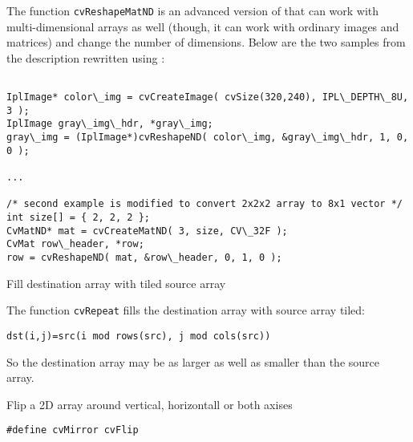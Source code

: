 The function \texttt{cvReshapeMatND} is an advanced version of  that can work with multi-dimensional arrays as well (though, it can work with ordinary images and matrices) and change the number of dimensions. Below are the two samples from the  description rewritten using :

\begin{lstlisting}

IplImage* color\_img = cvCreateImage( cvSize(320,240), IPL\_DEPTH\_8U, 3 );
IplImage gray\_img\_hdr, *gray\_img;
gray\_img = (IplImage*)cvReshapeND( color\_img, &gray\_img\_hdr, 1, 0, 0 );

...

/* second example is modified to convert 2x2x2 array to 8x1 vector */
int size[] = { 2, 2, 2 };
CvMatND* mat = cvCreateMatND( 3, size, CV\_32F );
CvMat row\_header, *row;
row = cvReshapeND( mat, &row\_header, 0, 1, 0 );

\end{lstlisting}


Fill destination array with tiled source array


\begin{description}
\end{description}


The function \texttt{cvRepeat} fills the destination array with source array tiled:

\begin{lstlisting}
dst(i,j)=src(i mod rows(src), j mod cols(src))
\end{lstlisting}

So the destination array may be as larger as well as smaller than the source array.



Flip a 2D array around vertical, horizontall or both axises


\begin{lstlisting}
#define cvMirror cvFlip
\end{lstlisting}

